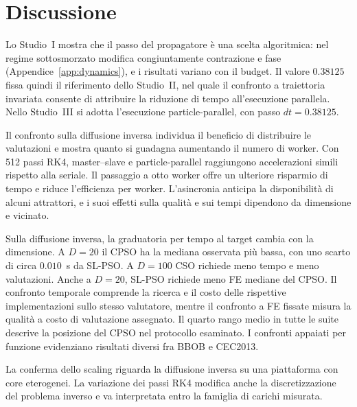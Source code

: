 \section{Discussione}\label{sec:discussion}

Lo Studio~I mostra che il passo del propagatore è una scelta algoritmica: nel regime sottosmorzato modifica congiuntamente contrazione e fase (Appendice~\ref{app:dynamics}), e i risultati variano con il budget. Il valore $0.38125$ fissa quindi il riferimento dello Studio~II, nel quale il confronto a traiettoria invariata consente di attribuire la riduzione di tempo all'esecuzione parallela. Nello Studio~III si adotta l'esecuzione particle-parallel, con passo $dt=0.38125$.

Il confronto sulla diffusione inversa individua il beneficio di distribuire le valutazioni e mostra quanto si guadagna aumentando il numero di worker. Con 512 passi RK4, master--slave e particle-parallel raggiungono accelerazioni simili rispetto alla seriale. Il passaggio a otto worker offre un ulteriore risparmio di tempo e riduce l'efficienza per worker. L'asincronia anticipa la disponibilità di alcuni attrattori, e i suoi effetti sulla qualità e sui tempi dipendono da dimensione e vicinato.

Sulla diffusione inversa, la graduatoria per tempo al target cambia con la dimensione. A $D=20$ il CPSO ha la mediana osservata più bassa, con uno scarto di circa $0.010$~s da SL-PSO. A $D=100$ CSO richiede meno tempo e meno valutazioni. Anche a $D=20$, SL-PSO richiede meno FE mediane del CPSO. Il confronto temporale comprende la ricerca e il costo delle rispettive implementazioni sullo stesso valutatore, mentre il confronto a FE fissate misura la qualità a costo di valutazione assegnato. Il quarto rango medio in tutte le suite descrive la posizione del CPSO nel protocollo esaminato. I confronti appaiati per funzione evidenziano risultati diversi fra BBOB e CEC2013.

La conferma dello scaling riguarda la diffusione inversa su una piattaforma con core eterogenei. La variazione dei passi RK4 modifica anche la discretizzazione del problema inverso e va interpretata entro la famiglia di carichi misurata.
